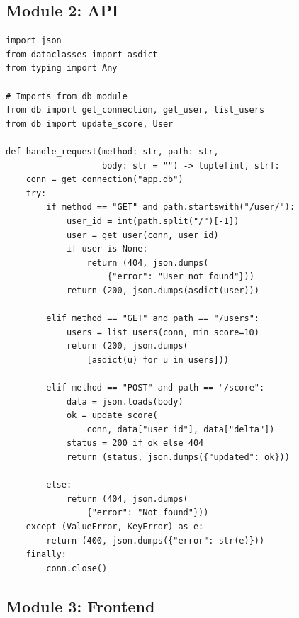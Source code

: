 \documentclass[11pt]{article}
\begin{document}
\subsection{Module 2: API}

\begin{lstlisting}[style=jugeo-python,caption={API module (api.py).}]
import json
from dataclasses import asdict
from typing import Any

# Imports from db module
from db import get_connection, get_user, list_users
from db import update_score, User

def handle_request(method: str, path: str,
                   body: str = "") -> tuple[int, str]:
    conn = get_connection("app.db")
    try:
        if method == "GET" and path.startswith("/user/"):
            user_id = int(path.split("/")[-1])
            user = get_user(conn, user_id)
            if user is None:
                return (404, json.dumps(
                    {"error": "User not found"}))
            return (200, json.dumps(asdict(user)))

        elif method == "GET" and path == "/users":
            users = list_users(conn, min_score=10)
            return (200, json.dumps(
                [asdict(u) for u in users]))

        elif method == "POST" and path == "/score":
            data = json.loads(body)
            ok = update_score(
                conn, data["user_id"], data["delta"])
            status = 200 if ok else 404
            return (status, json.dumps({"updated": ok}))

        else:
            return (404, json.dumps(
                {"error": "Not found"}))
    except (ValueError, KeyError) as e:
        return (400, json.dumps({"error": str(e)}))
    finally:
        conn.close()
\end{lstlisting}

\subsection{Module 3: Frontend}
\end{document}
